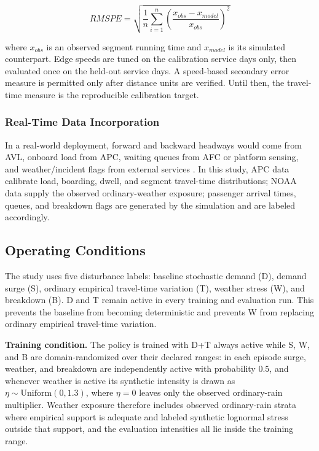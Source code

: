 \begin{equation} RMSPE = \sqrt{\frac{1}{n}\sum_{i=1}^{n}\left(\frac{x_{obs} - x_{model}}{x_{obs}}\right)^{2}} \label{eq:rmspe} \end{equation}

where $x_{obs}$ is an observed segment running time and $x_{model}$ is its simulated counterpart. Edge speeds are tuned on the calibration service days only, then evaluated once on the held-out service days. A speed-based secondary error measure is permitted only after distance units are verified. Until then, the travel-time measure is the reproducible calibration target.

\subsubsection{Real-Time Data Incorporation}

In a real-world deployment, forward and backward headways would come from AVL, onboard load from APC, waiting queues from AFC or platform sensing, and weather/incident flags from external services \cite{Wangsun}. In this study, APC data calibrate load, boarding, dwell, and segment travel-time distributions; NOAA data supply the observed ordinary-weather exposure; passenger arrival times, queues, and breakdown flags are generated by the simulation and are labeled accordingly.

\subsection{Operating Conditions}

The study uses five disturbance labels: baseline stochastic demand (D), demand surge (S), ordinary empirical travel-time variation (T), weather stress (W), and breakdown (B). D and T remain active in every training and evaluation run. This prevents the baseline from becoming deterministic and prevents W from replacing ordinary empirical travel-time variation.

\textbf{Training condition.} The policy is trained with D+T always active while S, W, and B are domain-randomized over their declared ranges: in each episode surge, weather, and breakdown are independently active with probability $0.5$, and whenever weather is active its synthetic intensity is drawn as $\eta \sim \mathrm{Uniform}(0, 1.3)$, where $\eta = 0$ leaves only the observed ordinary-rain multiplier. Weather exposure therefore includes observed ordinary-rain strata where empirical support is adequate and labeled synthetic lognormal stress outside that support, and the evaluation intensities all lie inside the training range.

